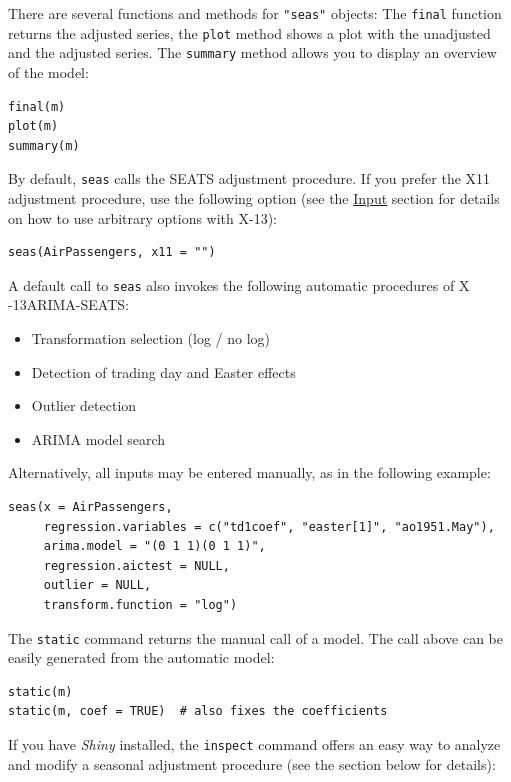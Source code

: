 There are several functions and methods for \texttt{"seas"} objects: The
\texttt{final} function returns the adjusted series, the \texttt{plot}
method shows a plot with the unadjusted and the adjusted series. The
\texttt{summary} method allows you to display an overview of the model:

\begin{verbatim}
final(m)
plot(m)
summary(m)
\end{verbatim}

By default, \texttt{seas} calls the SEATS adjustment procedure. If you
prefer the X11 adjustment procedure, use the following option (see the
\hyperref[input]{Input} section for details on how to use arbitrary
options with X-13):

\begin{verbatim}
seas(AirPassengers, x11 = "")
\end{verbatim}

A default call to \texttt{seas} also invokes the following automatic
procedures of X -13ARIMA-SEATS:

\begin{itemize}
\itemsep1pt\parskip0pt
\item
  Transformation selection (log / no log)
\item
  Detection of trading day and Easter effects
\item
  Outlier detection
\item
  ARIMA model search
\end{itemize}

Alternatively, all inputs may be entered manually, as in the following
example:

\begin{verbatim}
seas(x = AirPassengers, 
     regression.variables = c("td1coef", "easter[1]", "ao1951.May"), 
     arima.model = "(0 1 1)(0 1 1)", 
     regression.aictest = NULL,
     outlier = NULL, 
     transform.function = "log")
\end{verbatim}

The \texttt{static} command returns the manual call of a model. The call
above can be easily generated from the automatic model:

\begin{verbatim}
static(m)
static(m, coef = TRUE)  # also fixes the coefficients
\end{verbatim}

If you have \emph{Shiny} installed, the \texttt{inspect} command offers
an easy way to analyze and modify a seasonal adjustment procedure (see
the section below for details):

